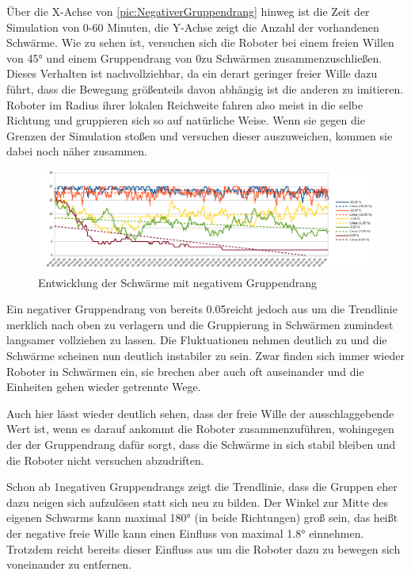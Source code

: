 Über die X-Achse von \autoref{pic:NegativerGruppendrang} hinweg ist die Zeit der Simulation von 0-60 Minuten, die Y-Achse zeigt die Anzahl der vorhandenen Schwärme.
Wie zu sehen ist, versuchen sich die Roboter bei einem  freien Willen von 45° und einem Gruppendrang von 0\per zu Schwärmen zusammenzuschließen.
Dieses Verhalten ist nachvollziehbar, da ein derart geringer freier Wille dazu führt, dass die Bewegung größenteils davon abhängig ist die anderen zu imitieren. Roboter im Radius ihrer lokalen Reichweite fahren also meist in die selbe Richtung und gruppieren sich so auf natürliche Weise. Wenn sie gegen die Grenzen der Simulation stoßen und versuchen dieser auszuweichen, kommen sie dabei noch näher zusammen.

\begin{figure}[h]
	\includegraphics[width=\textwidth, height=\statisticHeight]{graphics/Statistics/FlockGeneral/LocalRange1Speed01FreeWill45NegativeToFlock.png}
	\caption{Entwicklung der Schwärme mit negativem Gruppendrang}
	\label{pic:NegativerGruppendrang}
\end{figure}

Ein negativer Gruppendrang von bereits 0.05\per reicht jedoch aus um die Trendlinie merklich nach oben zu verlagern und die Gruppierung in Schwärmen zumindest langsamer vollziehen zu lassen. Die Fluktuationen nehmen deutlich zu und die Schwärme scheinen nun deutlich instabiler zu sein. Zwar finden sich immer wieder Roboter in Schwärmen ein, sie brechen aber auch oft auseinander und die Einheiten gehen wieder getrennte Wege.

Auch hier lässt wieder deutlich sehen, dass der freie Wille der ausschlaggebende Wert ist, wenn es darauf ankommt die Roboter zusammenzuführen, wohingegen der der Gruppendrang dafür sorgt, dass die Schwärme in sich stabil bleiben und die Roboter nicht versuchen abzudriften.

Schon ab 1\per negativen Gruppendrangs zeigt die Trendlinie, dass die Gruppen eher dazu neigen sich aufzulösen statt sich neu zu bilden. Der Winkel zur Mitte des eigenen Schwarms kann maximal 180° (in beide Richtungen) groß sein, das heißt der negative freie Wille kann einen Einfluss von maximal 1.8° einnehmen. Trotzdem reicht bereits dieser Einfluss aus um die Roboter dazu zu bewegen sich voneinander zu entfernen.


